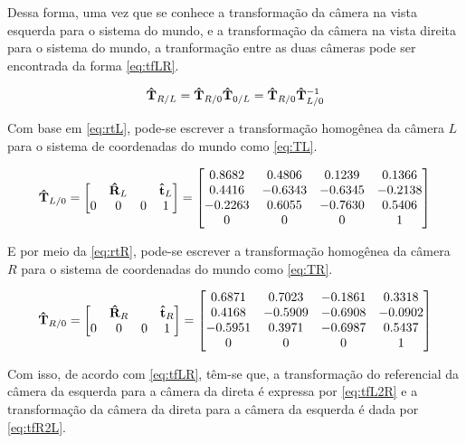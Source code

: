 Dessa forma, uma vez que se conhece a transformação da câmera na vista esquerda para o sistema do mundo, e a transformação da câmera na vista direita para o sistema do mundo, a tranformação entre as duas câmeras pode ser encontrada da forma \eqref{eq:tfLR}.

\begin{equation}
	\mathbf{\hat{T}}_{R/L} = \mathbf{\hat{T}}_{R/0}\mathbf{\hat{T}}_{0/L} =  \mathbf{\hat{T}}_{R/0}\mathbf{\hat{T}}_{L/0}^{-1}
	\label{eq:tfLR}
\end{equation}

Com base em \eqref{eq:rtL}, pode-se escrever a transformação homogênea da câmera $L$ para o sistema de coordenadas do mundo como \eqref{eq:TL}.

\begin{equation}\label{eq:TL}
	\mathbf{\hat{T}}_{L/0} = \begin{bmatrix}
		& \mathbf{\hat{R}}_L & & \mathbf{\hat{t}}_L\\
		0 & 0 & 0 & 1
	\end{bmatrix} = \begin{bmatrix}
	0.8682  & 0.4806  & 0.1239  & 0.1366  \\
	0.4416  & -0.6343 & -0.6345 & -0.2138 \\
	-0.2263 & 0.6055  & -0.7630 & 0.5406  \\
	0       & 0       & 0       & 1  
\end{bmatrix}
\end{equation}  

E por meio da \eqref{eq:rtR}, pode-se escrever a transformação homogênea da câmera $R$ para o sistema de coordenadas do mundo como \eqref{eq:TR}.

\begin{equation}\label{eq:TR}
 	\mathbf{\hat{T}}_{R/0} = \begin{bmatrix}
 		& \mathbf{\hat{R}}_R & & \mathbf{\hat{t}}_R\\
 		0 & 0 & 0 & 1
 	\end{bmatrix} = \begin{bmatrix}
 	0.6871  & 0.7023  & -0.1861 & 0.3318  \\
 	0.4168  & -0.5909 & -0.6908 & -0.0902 \\
 	-0.5951 & 0.3971  & -0.6987 & 0.5437  \\
 	0       & 0       & 0       & 1
 \end{bmatrix}
\end{equation} 


Com isso, de acordo com \eqref{eq:tfLR}, têm-se que, a transformação do referencial da câmera da esquerda para a câmera da direta é expressa por \eqref{eq:tfL2R} e a transformação da câmera da direta para a câmera da esquerda é dada por \eqref{eq:tfR2L}.

